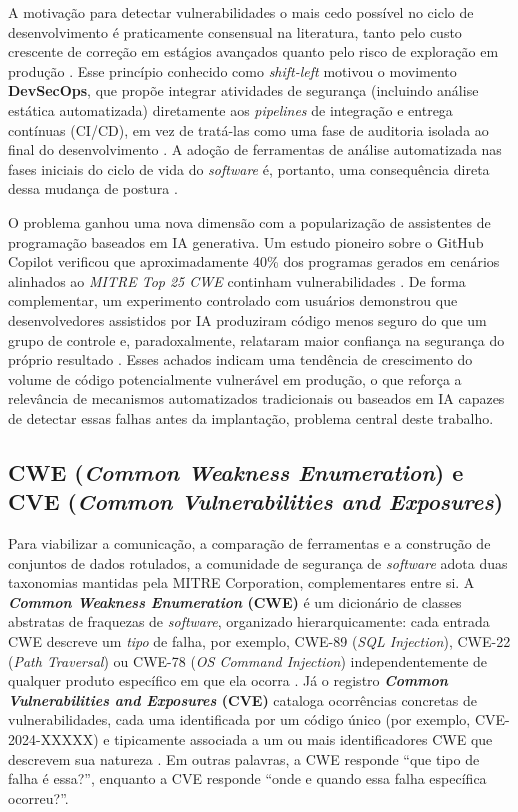 A motivação para detectar vulnerabilidades o mais cedo possível no ciclo de desenvolvimento é praticamente consensual na literatura, tanto pelo custo crescente de correção em estágios avançados quanto pelo risco de exploração em produção \cite{Dalaq2025SASTSLR, Shiri2024MLSLR}. Esse princípio conhecido como \textit{shift-left}  motivou o movimento \textbf{DevSecOps}, que propõe integrar atividades de segurança (incluindo análise estática automatizada) diretamente aos \textit{pipelines} de integração e entrega contínuas (CI/CD), em vez de tratá-las como uma fase de auditoria isolada ao final do desenvolvimento \cite{Myrbakken2017DevSecOps}. A adoção de ferramentas de análise automatizada nas fases iniciais do ciclo de vida do \textit{software} é, portanto, uma consequência direta dessa mudança de postura \cite{Wadhams2024SASTBarriers}.

O problema ganhou uma nova dimensão com a popularização de assistentes de programação baseados em IA generativa. Um estudo pioneiro sobre o GitHub Copilot verificou que aproximadamente 40\% dos programas gerados em cenários alinhados ao \textit{MITRE Top 25 CWE} continham vulnerabilidades \cite{Pearce2022CopilotSecurity}. De forma complementar, um experimento controlado com usuários demonstrou que desenvolvedores assistidos por IA produziram código menos seguro do que um grupo de controle e, paradoxalmente, relataram maior confiança na segurança do próprio resultado \cite{Perry2023InsecureAICode}. Esses achados indicam uma tendência de crescimento do volume de código potencialmente vulnerável em produção, o que reforça a relevância de mecanismos automatizados tradicionais ou baseados em IA capazes de detectar essas falhas antes da implantação, problema central deste trabalho.

\subsection{CWE (\textit{Common Weakness Enumeration}) e CVE (\textit{Common Vulnerabilities and Exposures})}\label{subsec:cwe-cve}
Para viabilizar a comunicação, a comparação de ferramentas e a construção de conjuntos de dados rotulados, a comunidade de segurança de \textit{software} adota duas taxonomias mantidas pela MITRE Corporation, complementares entre si. A \textbf{\textit{Common Weakness Enumeration} (CWE)} é um dicionário de classes abstratas de fraquezas de \textit{software}, organizado hierarquicamente: cada entrada CWE descreve um \textit{tipo} de falha, por exemplo, CWE-89 (\textit{SQL Injection}), CWE-22 (\textit{Path Traversal}) ou CWE-78 (\textit{OS Command Injection}) independentemente de qualquer produto específico em que ela ocorra \cite{MITRECWE2024}. Já o registro \textbf{\textit{Common Vulnerabilities and Exposures} (CVE)} cataloga ocorrências concretas de vulnerabilidades, cada uma identificada por um código único (por exemplo, CVE-2024-XXXXX) e tipicamente associada a um ou mais identificadores CWE que descrevem sua natureza \cite{MITRECVE2024}. Em outras palavras, a CWE responde ``que tipo de falha é essa?'', enquanto a CVE responde ``onde e quando essa falha específica ocorreu?''.

